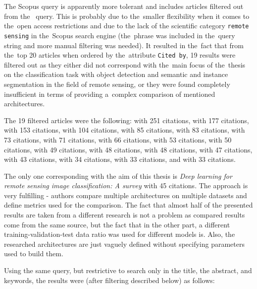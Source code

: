 \noindent The Scopus query is apparently more tolerant and includes articles filtered out from the~ query. This is probably due to the~smaller flexibility when it comes to the~open access restrictions and due to the lack of the scientific category \verb|remote sensing| in the~Scopus search engine (the~phrase was included in the~query string and more manual filtering was needed). It resulted in the~fact that from the~top 20 articles when ordered by the~attribute \verb|Cited by|, 19 results were filtered out as they either did not correspond with the~main focus of the~thesis on the classification task with object detection and semantic and instance segmentation in the field of remote sensing, or they were found completely insufficient in terms of providing a~complex comparison of mentioned architectures.

The 19 filtered articles were the following: \cite{dl-for-cv} with 251 citations, \cite{review-ml-in-rs} with 177 citations, \cite{review-ml-agriculture} with 153 citations, \cite{review-uav-applications} with 104 citations, \cite{state-of-the-art-ann} with 85 citations, \cite{lc-2-0} with 83 citations, \cite{state-of-the-art-dl} with 73 citations, \cite{review-water-dl} with 71 citations, \cite{review-plant-stress} with 66 citations, \cite{review-text-class} with 53 citations, \cite{cv-animal-ecology} with 50 citations, \cite{review-cv-infra-inspections} with 49 citations, \cite{review-ann-plant-disease} with 48 citations, \cite{review-st-fusion-multisource} with 48 citations, \cite{review-ml-energy} with 47 citations, \cite{review-bd-disaster} with 43 citations, \cite{review-uav-rs} with 34 citations, \cite{nanophotonics} with 33 citations, and \cite{review-point-clouds} with 33 citations.

The only one corresponding with the aim of this thesis is \textit{Deep learning for remote sensing image classification: A survey} \cite{review-dl-rs} with 45 citations. The approach is very fulfilling - authors compare multiple architectures on multiple datasets and define metrics used for the comparison. The fact that almost half of the presented results are taken from a different research is not a problem as compared results come from the same source, but the fact that in the other part, a different training-validation-test data ratio was used for different models is. Also, the researched architectures are just vaguely defined without specifying parameters used to build them.

Using the same query, but restrictive to search only in the title, the abstract, and keywords, the results were (after filtering described below) as follows:

